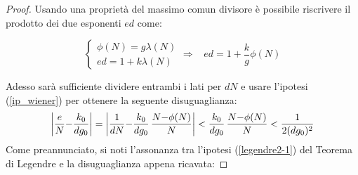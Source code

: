 \documentclass[twoside,symmetric,justified,openany,nobib]{tufte-book}
\begin{document}
\begin{proof}
  Usando una proprietà del massimo comun divisore è possibile riscrivere il prodotto dei due esponenti $ed$ come:

  \begin{equation}
    \label{sistema-ed}
    \begin{cases}
      \phi(N) = g\lambda(N)\\
      ed = 1{+}k\lambda(N)
    \end{cases}
    \Rightarrow\hspace{10pt} ed = 1{+}\frac{k}{g}\phi(N)
  \end{equation}

  \bigskip
  \noindent
  Adesso sarà sufficiente dividere entrambi i lati per $dN$ e usare l'ipotesi (\ref{ip_wiener}) per ottenere la seguente disuguaglianza:
  \begin{equation*}
    \abs{\frac{e}{N}{-}\frac{k_0}{dg_0}} = \abs{\frac{1}{dN}{-}\frac{k_0}{dg_0}\,\frac{N{-}\phi(N)}{N}} < \frac{k_0}{dg_0}\,\frac{N{-}\phi(N)}{N} < \frac{1}{2(dg_0)^2}
  \end{equation*}
  Come preannunciato, si noti l'assonanza tra l'ipotesi (\ref{legendre2-1}) del Teorema di Legendre e la disuguaglianza appena ricavata:


\end{proof}
\end{document}
